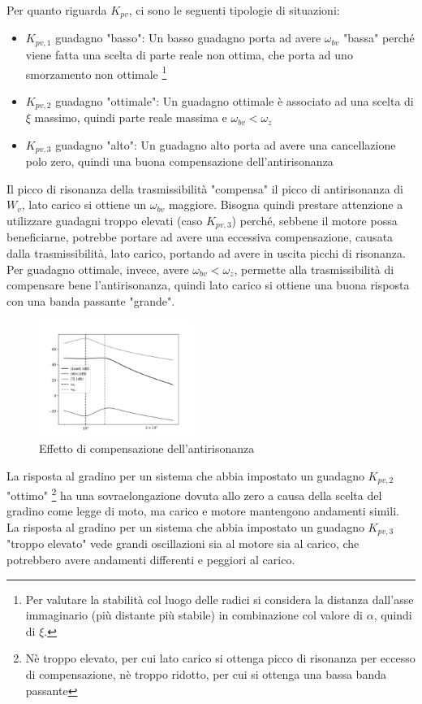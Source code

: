 Per quanto riguarda \(K_{pv}\), ci sono le seguenti tipologie di situazioni:
\begin{itemize}
    \item \(K_{pv,1}\) guadagno "basso": Un basso guadagno porta ad avere \(\omega_{bv}\) "bassa" perché viene fatta una scelta di parte reale non ottima, che porta ad uno smorzamento non ottimale \footnote{Per valutare la stabilità col luogo delle radici si considera la distanza dall'asse immaginario (più distante più stabile) in combinazione col valore di \(\alpha\), quindi di \(\xi\).}
    \item \(K_{pv,2}\) guadagno "ottimale": Un guadagno ottimale è associato ad una scelta di \(\xi\) massimo, quindi parte reale massima e \(\omega_{bv} < \omega_z\)
    \item \(K_{pv,3}\) guadagno "alto": Un guadagno alto porta ad avere una cancellazione polo zero, quindi una buona compensazione dell'antirisonanza
\end{itemize}

Il picco di risonanza della trasmissibilità "compensa" il picco di antirisonanza di \(W_v\), lato carico si ottiene un \(\omega_{bv}\) maggiore.
Bisogna quindi prestare attenzione a utilizzare guadagni troppo elevati (caso \(K_{pv,3}\)) perché, sebbene il motore possa beneficiarne, potrebbe portare ad avere una eccessiva compensazione, causata dalla trasmissibilità, lato carico, portando ad avere in uscita picchi di risonanza.
Per guadagno ottimale, invece, avere \(\omega_{bv} < \omega_z\), permette alla trasmissibilità di compensare bene l'antirisonanza, quindi lato carico si ottiene una buona risposta con una banda passante "grande".

\begin{figure}[h]
    \centering
    \includegraphics[width=0.45\textwidth]{Immagini/colocato_v_lato_carico.png}
    \caption{Effetto di compensazione dell'antirisonanza}
\end{figure}

La risposta al gradino per un sistema che abbia impostato un guadagno \(K_{pv,2}\) "ottimo" \footnote{Nè troppo elevato, per cui lato carico si ottenga picco di risonanza per eccesso di compensazione, nè troppo ridotto, per cui si ottenga una bassa banda passante} ha una sovraelongazione dovuta allo zero a causa della scelta del gradino come legge di moto, ma carico e motore mantengono andamenti simili.
La risposta al gradino per un sistema che abbia impostato un guadagno \(K_{pv,3}\) "troppo elevato" vede grandi oscillazioni sia al motore sia al carico, che potrebbero avere andamenti differenti e peggiori al carico.

